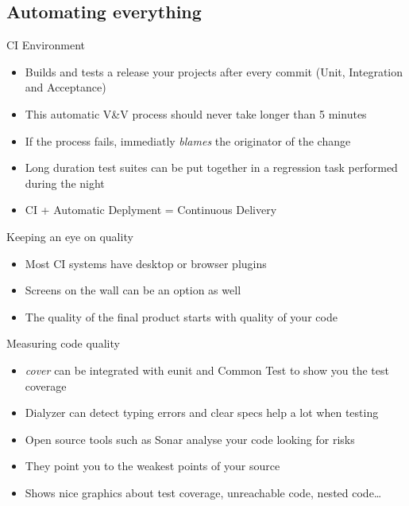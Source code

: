 \documentclass[pdf]{beamer}
\begin{document}
\subsection*{Automating everything}
\label{automating_everything}

\begin{frame}{CI Environment}
    \begin{itemize}
    \item Builds and tests a release your projects after every commit (Unit, Integration and Acceptance)
    \pause
    \item This automatic V\&V process should never take longer than 5 minutes
    \pause
    \item If the process fails, immediatly \emph{blames} the originator of the change
    \pause
    \item Long duration test suites can be put together in a regression task performed during the night
    \pause
    \item CI + Automatic Deplyment = Continuous Delivery
    \end{itemize}
\end{frame}

\begin{frame}{Keeping an eye on quality}
    \begin{itemize}
    \item Most CI systems have desktop or browser plugins
    \item Screens on the wall can be an option as well
    \item The quality of the final product starts with quality of your code
    \end{itemize}
\end{frame}

\begin{frame}{Measuring code quality}
    \begin{itemize}
    \item \emph{cover} can be integrated with eunit and Common Test to show you the test coverage
    \item Dialyzer can detect typing errors and clear specs help a lot when testing
    \item Open source tools such as Sonar analyse your code looking for risks
    \item They point you to the weakest points of your source
    \item Shows nice graphics about test coverage, unreachable code, nested code\dots
    \end{itemize}
\end{frame}
\end{document}
